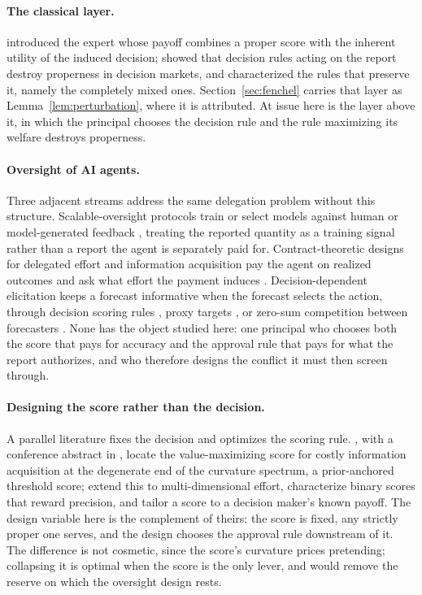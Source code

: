 \documentclass[acmsmall,nonacm,screen]{acmart}
\theoremstyle{acmplain}%
\theoremstyle{acmdefinition}%
\numberwithin{equation}{section}
\begin{document}
\paragraph{The classical layer.} \citet{boutilier2012eliciting} introduced the expert whose payoff combines a proper score with the inherent utility of the induced decision; \citet{othman2010decision} showed that decision rules acting on the report destroy properness in decision markets, and \citet{chen2014eliciting} characterized the rules that preserve it, namely the completely mixed ones. Section~\ref{sec:fenchel} carries that layer as Lemma~\ref{lem:perturbation}, where it is attributed. At issue here is the layer above it, in which the principal chooses the decision rule and the rule maximizing its welfare destroys properness.

\paragraph{Oversight of AI agents.} Three adjacent streams address the same delegation problem without this structure. Scalable-oversight protocols train or select models against human or model-generated feedback \citep{christiano2017preferences,irving2018debate}, treating the reported quantity as a training signal rather than a report the agent is separately paid for. Contract-theoretic designs for delegated effort and information acquisition pay the agent on realized outcomes and ask what effort the payment induces \citep{papireddygari2022contracts,oesterheld2020minimum}. Decision-dependent elicitation keeps a forecast informative when the forecast selects the action, through decision scoring rules \citep{oesterheld2021decision}, proxy targets \citep{wang2023proxy}, or zero-sum competition between forecasters \citep{hudson2024joint}. None has the object studied here: one principal who chooses both the score that pays for accuracy and the approval rule that pays for what the report authorizes, and who therefore designs the conflict it must then screen through.

\paragraph{Designing the score rather than the decision.} A parallel literature fixes the decision and optimizes the scoring rule. \citet{li2020optimization}, with a conference abstract in \citet{li2022optimizationabstract}, locate the value-maximizing score for costly information acquisition at the degenerate end of the curvature spectrum, a prior-anchored threshold score; \citet{hartline2023optimal} extend this to multi-dimensional effort, \citet{neyman2021binary} characterize binary scores that reward precision, and \citet{johnstone2011tailored} tailor a score to a decision maker's known payoff. The design variable here is the complement of theirs: the score is fixed, any strictly proper one serves, and the design chooses the approval rule downstream of it. The difference is not cosmetic, since the score's curvature prices pretending; collapsing it is optimal when the score is the only lever, and would remove the reserve on which the oversight design rests.
\end{document}
